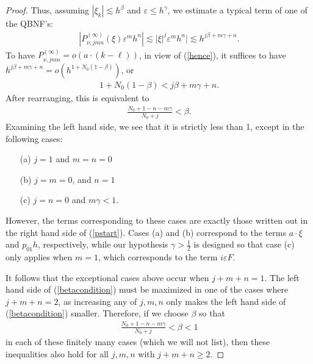 \documentclass[12pt,lettersize]{article}
\renewcommand{\epsilon}{\varepsilon}
\theoremstyle{plain}%
\numberwithin{theorem}{section}
\numberwithin{equation}{section}
\theoremstyle{definition}
\theoremstyle{remark}
\begin{document}
{\begin{proof}
Thus, assuming $|\xi_k| \lesssim h^\beta$ and $\epsilon\leq  h^\gamma$, 
we estimate a typical term of one of the QBNF's:
% 
\begin{align*}{}
|P^{(\infty)}_{\nu,jmn}(\xi)\epsilon^mh^n| \lesssim |\xi|^j \epsilon^m h^n| \lesssim h^{j\beta + m \gamma + n}. 
\end{align*}
%
To have $P^{(\infty)}_{\nu,jmn} = o(a\cdot(k-\ell))$, in view of (\ref{hence}), it suffices to have $h^{j\beta + m\gamma + n} = o(h^{1+{N_0}(1-\beta)})$, or
%
\begin{align*}{}
1+{N_0}(1-\beta) < j\beta + m\gamma + n.
\end{align*}
%
After rearranging, this is equivalent to 
%
\begin{align}\label{betacondition}
\frac{{N_0}+1-n-m\gamma}{{N_0}+j} < \beta. 
\end{align}
%
Examining the left hand side, we see that it is strictly less than 1, except in the following cases:
%
\begin{itemize}
\item[(a)] $j = 1$ and $m = n = 0$
\item[(b)] $j = m = 0$, and $n = 1$
\item[(c)] $j = n = 0$ and $m\gamma < 1$. 
\end{itemize}
%
However, the terms corresponding to these cases are exactly those written out in the right hand side of (\ref{pstart}). Cases (a) and (b) correspond to the terms $a\cdot \xi$ and $p_{01}h$, respectively, while our hypothesis $\gamma > \frac 12$ is designed so that case (c) only applies when $m = 1$, which corresponds to the term $i\epsilon F$. 

It follows that the exceptional cases above occur when $j + m + n = 1$. The left hand side of (\ref{betacondition}) must be maximized in one of the cases where $j + m + n = 2$, as increasing any of $j,m,n$ only makes the left hand side of (\ref{betacondition}) smaller. Therefore, if we choose $\beta$ so that
%
\begin{align*}
\frac{{N_0}+1-n-m\gamma}{{N_0}+j} < \beta < 1
\end{align*}
%
in each of these finitely many cases (which we will not list), then these inequalities also hold for all $j,m,n$ with $j + m + n \geq 2$. 


\end{proof}}
\end{document}

